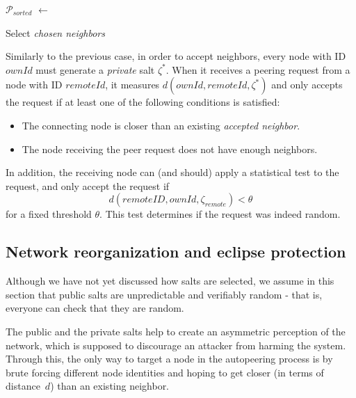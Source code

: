\documentclass[../main.tex]{subfiles}
\begin{document}
\begin{algorithm}[htb]
\DontPrintSemicolon
{}
\BlankLine
$\mathcal{P}_{sorted}$ $\gets$ \;
\BlankLine
{}
\caption{Select \emph{chosen neighbors}}
\label{alg:choose_neighbors}
\end{algorithm}

Similarly to the previous case, in order to accept neighbors, every node with ID~$ownId$ must generate a \textit{private} salt $\zeta^*$. When it receives a peering request from a node with ID $remoteId$, it measures $d(ownId, remoteId, \zeta^*)$ and only accepts the request if at least one of the following conditions is satisfied:
\begin{itemize}
    \item The connecting node is closer than an existing \emph{accepted neighbor}.
    \item The node receiving the peer request does not have enough neighbors.
\end{itemize}

In addition, the receiving node can (and should) apply a statistical test to the request, and only accept the request if
\[d({remoteID}, ownId, \zeta_{remote})<\theta\]
for a fixed threshold $\theta$.  This test determines if the request was indeed random. 



\subsection{Network reorganization and eclipse protection}

Although we have not yet discussed how salts are selected, we assume in this section that public salts are unpredictable and verifiably random - that is, everyone can check that they are random.  

The public and the private salts help to create an asymmetric perception of the network, which is supposed to discourage an attacker from harming the system. Through this, the only way to target a node in the autopeering process is by brute forcing different node identities and hoping to get closer (in terms of distance~$d$) than an existing neighbor. 
\end{document}

